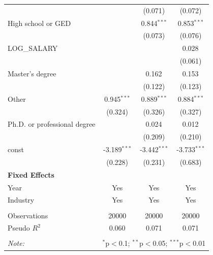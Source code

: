 \begin{table}[!htbp]
\begin{tabular}{@{\extracolsep{5pt}}lccc}
& & (0.071) & (0.072) \\
 High school or GED & & 0.844$^{***}$ & 0.853$^{***}$ \\
& & (0.073) & (0.076) \\
 LOG_SALARY & & & 0.028$^{}$ \\
& & & (0.061) \\
 Master's degree & & 0.162$^{}$ & 0.153$^{}$ \\
& & (0.122) & (0.123) \\
 Other & 0.945$^{***}$ & 0.889$^{***}$ & 0.884$^{***}$ \\
& (0.324) & (0.326) & (0.327) \\
 Ph.D. or professional degree & & 0.024$^{}$ & 0.012$^{}$ \\
& & (0.209) & (0.210) \\
 const & -3.189$^{***}$ & -3.442$^{***}$ & -3.733$^{***}$ \\
& (0.228) & (0.231) & (0.683) \\
 \textbf{Fixed Effects} &  &  &  \\
 Year & Yes & Yes & Yes \\
 Industry & Yes & Yes & Yes \\
\hline \\[-1.8ex]
 Observations & 20000 & 20000 & 20000 \\
 Pseudo $R^2$ & 0.060 & 0.071 & 0.071 \\
\hline
\hline \\[-1.8ex]
\textit{Note:} & \multicolumn{3}{r}{$^{*}$p$<$0.1; $^{**}$p$<$0.05; $^{***}$p$<$0.01} \\
\end{tabular}
\end{table}